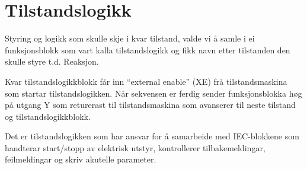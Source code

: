 \newpage
\section{Tilstandslogikk}
\thispagestyle{fancy}

Styring og logikk som skulle skje i kvar tilstand, valde vi å samle i ei funksjonsblokk som vart kalla tilstandslogikk og fikk navn etter tilstanden
den skulle styre t.d. Reaksjon. %

Kvar tilstandslogikkblokk får inn ``external enable'' (\gls{XE}) frå tilstandsmaskina som startar tilstandslogikken. Når sekvensen er ferdig sender
funksjonsblokka høg på utgang Y som returerast til tilstandsmaskina som avanserer til neste tilstand og tilstandslogikkblokk.

Det er tilstandslogikken som har ansvar for å samarbeide med \gls{IEC}-blokkene som handterar
start/stopp av elektrisk utstyr, kontrollerer tilbakemeldingar, feilmeldingar og skriv akutelle parameter.

